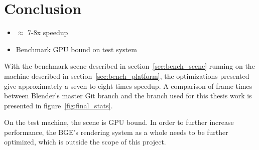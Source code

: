 \section{Conclusion}
\ifsummaries
\begin{itemize}
 \item $\approx$ 7-8x speedup
 \item Benchmark GPU bound on test system
\end{itemize}
\fi

With the benchmark scene described in section~\ref{sec:bench_scene} running on the machine described in section~\ref{sec:bench_platform}, the optimizations presented give approximately a seven to eight times speedup.
A comparison of frame times between Blender's master Git branch and the branch used for this thesis work is presented in figure~\ref{fig:final_stats}.


On the test machine, the scene is GPU bound. In order to further increase performance, the BGE's rendering system as a whole needs to be further optimized, which is outside the scope of this project.

